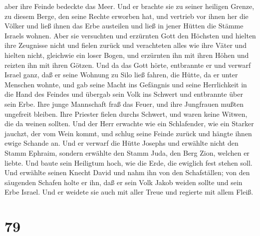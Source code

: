 aber ihre Feinde bedeckte das Meer.  Und er brachte sie zu
seiner heiligen Grenze, zu diesem Berge, den seine Rechte erworben hat,
 und vertrieb vor ihnen her die Völker und ließ ihnen das
Erbe austeilen und ließ in jener Hütten die Stämme Israels wohnen.
 Aber sie versuchten und erzürnten Gott den Höchsten und
hielten ihre Zeugnisse nicht  und fielen zurück und
verachteten alles wie ihre Väter und hielten nicht, gleichwie ein loser
Bogen,  und erzürnten ihn mit ihren Höhen und reizten ihn
mit ihren Götzen.  Und da das Gott hörte, entbrannte er und
verwarf Israel ganz,  daß er seine Wohnung zu Silo ließ
fahren, die Hütte, da er unter Menschen wohnte,  und gab
seine Macht ins Gefängnis und seine Herrlichkeit in die Hand des Feindes
 und übergab sein Volk ins Schwert und entbrannte über sein
Erbe.  Ihre junge Mannschaft fraß das Feuer, und ihre
Jungfrauen mußten ungefreit bleiben.  Ihre Priester fielen
durchs Schwert, und waren keine Witwen, die da weinen sollten.
 Und der Herr erwachte wie ein Schlafender, wie ein Starker
jauchzt, der vom Wein kommt,  und schlug seine Feinde
zurück und hängte ihnen ewige Schande an.  Und er verwarf
die Hütte Josephs und erwählte nicht den Stamm Ephraim, 
sondern erwählte den Stamm Juda, den Berg Zion, welchen er liebte.
 Und baute sein Heiligtum hoch, wie die Erde, die ewiglich
fest stehen soll.  Und erwählte seinen Knecht David und
nahm ihn von den Schafställen;  von den säugenden Schafen
holte er ihn, daß er sein Volk Jakob weiden sollte und sein Erbe Israel.
 Und er weidete sie auch mit aller Treue und regierte mit
allem Fleiß.

\hypertarget{section-78}{%
\section{79}\label{section-78}}

